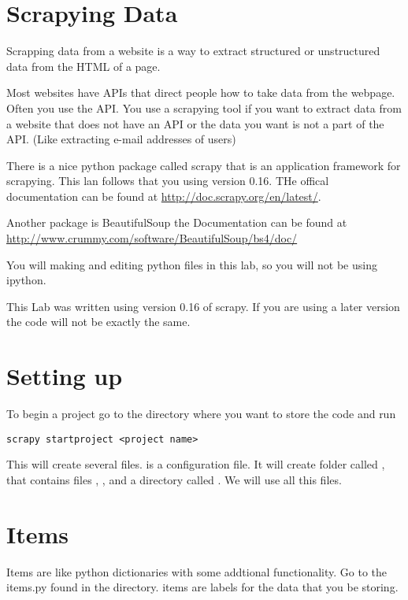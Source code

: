 
\section*{Scrapying Data}
Scrapping data from a website is a way to extract structured or unstructured data from the HTML of a page.

Most websites have APIs that direct people how to take data from the webpage. Often you use the API. You use a scrapying tool if you want to extract data from a website that does not have an API or the data you want is not a part of the API. (Like extracting e-mail addresses of users)

There is a nice python package called scrapy that is an application framework for scrapying. This lan follows that you using version 0.16. THe offical documentation can be found at \url{http://doc.scrapy.org/en/latest/}. 

Another package is BeautifulSoup the Documentation can be found at \url{http://www.crummy.com/software/BeautifulSoup/bs4/doc/}

\begin{info}
You will making and editing python files in this lab, so you will not be using ipython.
\end{info}

\begin{warn}
This Lab was written using version 0.16 of scrapy. If you are using a later version the code will not be exactly the same.
\end{warn}

\section*{Setting up}

To begin a project go to the directory where you want to store the code and run
\begin{lstlisting}
scrapy startproject <project name>
\end{lstlisting}
This will create several files.  is a configuration file. It will create folder called  , that contains files , ,  and a directory called . We will use all this files.

\section*{Items}
Items are like python dictionaries with some addtional functionality. Go to the items.py found in the   directory. items are labels for the data that you be storing.

